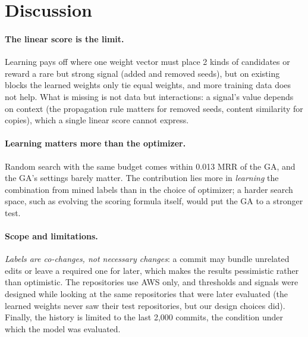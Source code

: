 \section{Discussion}
\label{sec:discussion}

\paragraph{The linear score is the limit.} Learning pays off where one weight vector must place 2
kinds of candidates or reward a rare but strong signal (added and removed seeds), but on existing
blocks the learned weights only tie equal weights, and more training data does not help. What is
missing is not data but interactions: a signal's value depends on context (the propagation rule
matters for removed seeds, content similarity for copies), which a single linear score cannot
express.

\paragraph{Learning matters more than the optimizer.} Random search with the same budget comes within 0.013 MRR
of the GA, and the GA's settings barely matter. The contribution lies more in \emph{learning} the
combination from mined labels than in the choice of optimizer; a harder search space, such as
evolving the scoring formula itself, would put the GA to a stronger test.

\paragraph{Scope and limitations.} \emph{Labels are co-changes, not necessary changes}: a commit may bundle
unrelated edits or leave a required one for later, which makes the results pessimistic rather than
optimistic. The repositories use AWS only, and thresholds and signals were designed while looking at
the same repositories that were later evaluated (the learned weights never saw their test
repositories, but our design choices did). Finally, the history is limited to the last 2,000
commits, the condition under which the model was evaluated.

